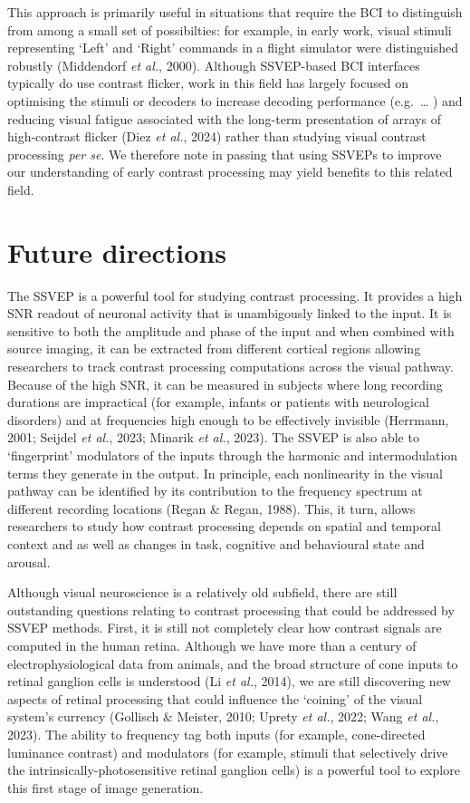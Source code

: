 \documentclass[
  letterpaper,
  DIV=11,
  numbers=noendperiod]{scrartcl}
\begin{document}
This approach is primarily useful in situations that require the BCI to
distinguish from among a small set of possibilties: for example, in
early work, visual stimuli representing `Left' and `Right' commands in a
flight simulator were distinguished robustly (Middendorf \emph{et al.},
2000). Although SSVEP-based BCI interfaces typically do use contrast
flicker, work in this field has largely focused on optimising the
stimuli or decoders to increase decoding performance (e.g.~\ldots{} )
and reducing visual fatigue associated with the long-term presentation
of arrays of high-contrast flicker (Diez \emph{et al.}, 2024) rather
than studying visual contrast processing \textit{per se}. We therefore
note in passing that using SSVEPs to improve our understanding of early
contrast processing may yield benefits to this related field.

\section{Future directions}\label{future-directions}

The SSVEP is a powerful tool for studying contrast processing. It
provides a high SNR readout of neuronal activity that is unambigously
linked to the input. It is sensitive to both the amplitude and phase of
the input and when combined with source imaging, it can be extracted
from different cortical regions allowing researchers to track contrast
processing computations across the visual pathway. Because of the high
SNR, it can be measured in subjects where long recording durations are
impractical (for example, infants or patients with neurological
disorders) and at frequencies high enough to be effectively invisible
(Herrmann, 2001; Seijdel \emph{et al.}, 2023; Minarik \emph{et al.},
2023). The SSVEP is also able to `fingerprint' modulators of the inputs
through the harmonic and intermodulation terms they generate in the
output. In principle, each nonlinearity in the visual pathway can be
identified by its contribution to the frequency spectrum at different
recording locations (Regan \& Regan, 1988). This, it turn, allows
researchers to study how contrast processing depends on spatial and
temporal context and as well as changes in task, cognitive and
behavioural state and arousal.

Although visual neuroscience is a relatively old subfield, there are
still outstanding questions relating to contrast processing that could
be addressed by SSVEP methods. First, it is still not completely clear
how contrast signals are computed in the human retina. Although we have
more than a century of electrophysiological data from animals, and the
broad structure of cone inputs to retinal ganglion cells is understood
(Li \emph{et al.}, 2014), we are still discovering new aspects of
retinal processing that could influence the `coining' of the visual
system's currency (Gollisch \& Meister, 2010; Uprety \emph{et al.},
2022; Wang \emph{et al.}, 2023). The ability to frequency tag both
inputs (for example, cone-directed luminance contrast) and modulators
(for example, stimuli that selectively drive the
intrinsically-photosensitive retinal ganglion cells) is a powerful tool
to explore this first stage of image generation.
\end{document}
